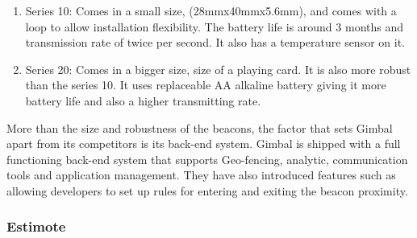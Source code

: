 \begin{enumerate}
\item Series 10: Comes in a small size, (28mmx40mmx5.6mm), and comes with
a loop to allow installation flexibility. The battery life is around
3 months and transmission rate of twice per second. It also has a
temperature sensor on it.
\item Series 20: Comes in a bigger size, size of a playing card. It is also
more robust than the series 10. It uses replaceable AA alkaline battery
giving it more battery life and also a higher transmitting rate.
\end{enumerate}
More than the size and robustness of the beacons, the factor that
sets Gimbal apart from its competitors is its back-end system. Gimbal
is shipped with a full functioning back-end system that supports Geo-fencing\cite{geofencing},
analytic, communication tools and application management. They have
also introduced features such as allowing developers to set up rules
for entering and exiting the beacon proximity.


\subsubsection{Estimote}

